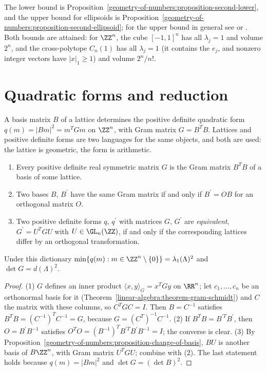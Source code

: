The lower bound is Proposition~\ref{geometry-of-numbers:proposition-second-lower}, and the upper bound for ellipsoids is Proposition~\ref{geometry-of-numbers:proposition-second-ellipsoid}; for the upper
bound in general see \cite{cassels-geometry-numbers} or \cite{gruber-lekkerkerker}. Both bounds are attained: for $\ZZ^n$, the cube $[-1, 1]^n$ has all $\lambda_j = 1$ and volume $2^n$, and the
cross-polytope $C_n(1)$ has all $\lambda_j = 1$ (it contains the $e_j$, and nonzero integer vectors have $|x|_1 \geq 1$) and volume $2^n/n!$.

\section{Quadratic forms and reduction}\label{geometry-of-numbers:section-reduction}

A basis matrix $B$ of a lattice determines the positive definite quadratic form $q(m) = |Bm|^2 = m^TGm$ on $\ZZ^n$, with Gram matrix $G = B^TB$. Lattices and positive definite forms are two
languages for the same objects, and both are used: the lattice is geometric, the form is arithmetic.

\begin{proposition}\label{geometry-of-numbers:proposition-forms-lattices}
\begin{enumerate}
\item Every positive definite real symmetric matrix $G$ is the Gram matrix $B^TB$ of a basis of some lattice.
\item Two bases $B$, $B^{\prime}$ have the same Gram matrix if and only if $B^{\prime} = OB$ for an orthogonal matrix $O$.
\item Two positive definite forms $q$, $q^{\prime}$ with matrices $G$, $G^{\prime}$ are \emph{equivalent}, $G^{\prime} = U^TGU$ with $U \in \GL_n(\ZZ)$, if and only if the corresponding lattices differ by an
orthogonal transformation.
\end{enumerate}
Under this dictionary $\min\{q(m) : m \in \ZZ^n \setminus \{0\}\} = \lambda_1(\Lambda)^2$ and $\det G = d(\Lambda)^2$.
\end{proposition}

\begin{proof}
(1) $G$ defines an inner product $\langle x, y \rangle_G = x^TGy$ on $\RR^n$; let $c_1, \ldots, c_n$ be an orthonormal basis for it (Theorem~\ref{linear-algebra:theorem-gram-schmidt}) and $C$ the matrix
with these columns, so $C^TGC = I$. Then $B = C^{-1}$ satisfies $B^TB = (C^{-1})^T C^{-1} = G$, because $G = (C^T)^{-1}C^{-1}$. (2) If $B^TB = B^{\prime T}B^{\prime}$, then $O = B^{\prime}B^{-1}$ satisfies
$O^TO = (B^{-1})^TB^{\prime T}B^{\prime}B^{-1} = I$; the converse is clear. (3) By Proposition~\ref{geometry-of-numbers:proposition-change-of-basis}, $BU$ is another basis of $B\ZZ^n$, with Gram matrix
$U^TGU$; combine with (2). The last statement holds because $q(m) = |Bm|^2$ and $\det G = (\det B)^2$.
\end{proof}

